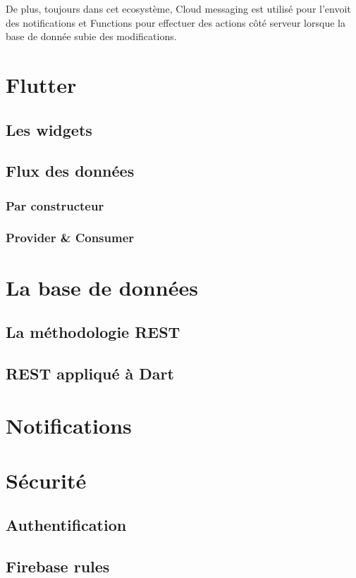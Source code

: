     De plus, toujours dans cet ecosystème, Cloud messaging est utilisé pour l'envoit des notifications et Functions pour 
    effectuer des actions côté serveur lorsque la base de donnée subie des modifications. 
    
    \section{Flutter}

    \subsection{Les widgets}

    \subsection{Flux des données}

        \subsubsection{Par constructeur}

        \subsubsection{Provider \& Consumer}


    \section{La base de données}
        \subsection{La méthodologie REST}
        \subsection{REST appliqué à Dart}

            
    \section{Notifications}


    
    \section{Sécurité}

        \subsection{Authentification}

        \subsection{Firebase rules}

